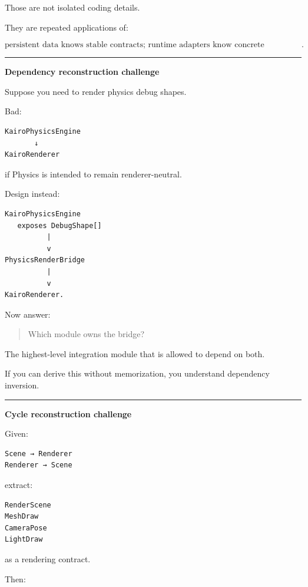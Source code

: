 Those are not isolated coding details.

They are repeated applications of:

\[
\boxed{
\text{persistent data knows stable contracts;
runtime adapters know concrete implementations}.
}
\]

\begin{center}\rule{0.5\linewidth}{0.5pt}\end{center}

\textbf{Dependency reconstruction challenge}

Suppose you need to render physics debug shapes.

Bad:

\begin{verbatim}
KairoPhysicsEngine
       ↓
KairoRenderer
\end{verbatim}

if Physics is intended to remain renderer-neutral.

Design instead:

\begin{verbatim}
KairoPhysicsEngine
   exposes DebugShape[]
          |
          v
PhysicsRenderBridge
          |
          v
KairoRenderer.
\end{verbatim}

Now answer:

\begin{quote}
Which module owns the bridge?
\end{quote}

The highest-level integration module that is allowed to depend on both.

If you can derive this without memorization, you understand dependency inversion.

\begin{center}\rule{0.5\linewidth}{0.5pt}\end{center}

\textbf{Cycle reconstruction challenge}

Given:

\begin{verbatim}
Scene → Renderer
Renderer → Scene
\end{verbatim}

extract:

\begin{verbatim}
RenderScene
MeshDraw
CameraPose
LightDraw
\end{verbatim}

as a rendering contract.

Then:

